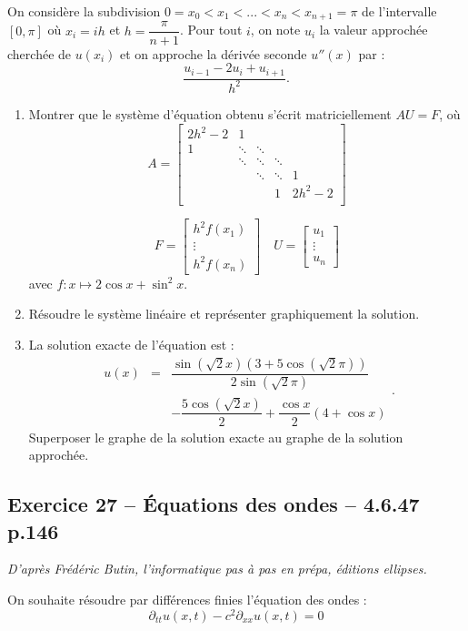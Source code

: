 \documentclass[10pt,fleqn]{article} %
\begin{document}
\begin{multicols}{2}
On considère la subdivision $0=x_0<x_1<...<x_n<x_{n+1} = \pi$ de l'intervalle $[0,\pi]$ où $x_i=ih$ et $h=\dfrac{\pi}{n+1}$. Pour tout $i$, on note $u_i$ la valeur approchée cherchée de $u(x_i)$ et on approche la dérivée seconde $u''(x)$ par :
$$
\dfrac{u_{i-1}-2u_i+u_{i+1}}{h^2}.
$$

\begin{enumerate}
\item Montrer que le système d'équation obtenu s'écrit matriciellement $AU=F$, où 
$$
A= 
\begin{bmatrix}
2h^2 - 2 & 1        & & & \\
1           & \ddots & \ddots & &  \\
& \ddots & \ddots &\ddots  & \\
& & \ddots & \ddots &1\\  
&& & 1 & 2h^2-2 \\
\end{bmatrix}
$$

$$
F=
\begin{bmatrix}
h^2 f(x_1) \\
\vdots \\
h^2 f(x_n)
\end{bmatrix}
\quad
U=
\begin{bmatrix}
u_1 \\
\vdots \\
u_n
\end{bmatrix}
$$
avec $f:x\mapsto 2 \cos x + \sin^2 x$.
\item Résoudre le système linéaire et représenter graphiquement la solution. 
\item La solution exacte de l'équation est :
$$
\begin{array}{lcl}
u(x)&=&\dfrac{\sin \left(\sqrt{2} x\right)  \left( 3+5 \cos \left(\sqrt 2 \pi \right)\right)}{2\sin \left(\sqrt{2} \pi\right)} \\
&&- \dfrac{5\cos \left(\sqrt{2} x\right)}{2}
+ \dfrac{\cos x}{2} \left( 4+\cos x\right)
\end{array}.
$$
Superposer le graphe de la solution exacte au graphe de la solution approchée.
\end{enumerate}


\subsection*{Exercice 27 -- Équations des ondes -- 4.6.47 p.146}
\begin{flushright}
\textit{D'après Frédéric Butin, l'informatique pas à pas en prépa, éditions ellipses.}
\end{flushright}
On souhaite résoudre par différences finies l'équation des ondes : 
$$
\partial_{tt} u(x,t) - c^2 \partial_{xx} u(x,t) = 0
$$


\end{multicols}
\end{document}
